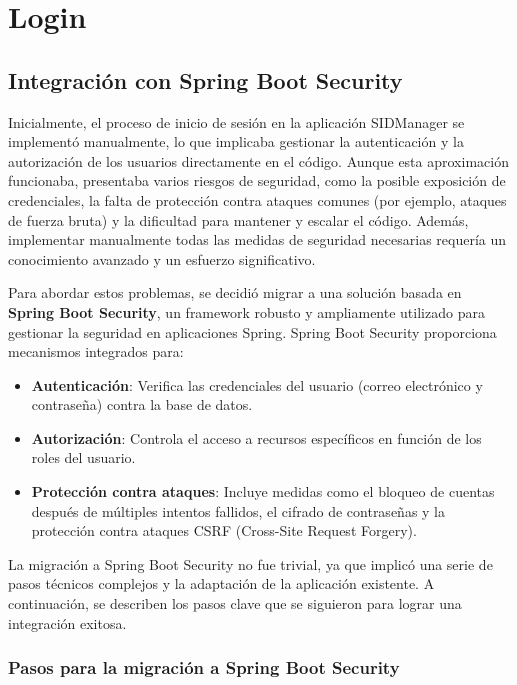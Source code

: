 \documentclass[draft]{scrbook}
\begin{document}
\section{ Login }
\label{sec:login}
\subsection{Integración con Spring Boot Security}
\label{subsec:spring-security}

Inicialmente, el proceso de inicio de sesión en la aplicación SIDManager se implementó manualmente, lo que implicaba gestionar la autenticación y la autorización de los usuarios directamente en el código. Aunque esta aproximación funcionaba, presentaba varios riesgos de seguridad, como la posible exposición de credenciales, la falta de protección contra ataques comunes (por ejemplo, ataques de fuerza bruta) y la dificultad para mantener y escalar el código. Además, implementar manualmente todas las medidas de seguridad necesarias requería un conocimiento avanzado y un esfuerzo significativo.

Para abordar estos problemas, se decidió migrar a una solución basada en \textbf{Spring Boot Security}, un framework robusto y ampliamente utilizado para gestionar la seguridad en aplicaciones Spring. Spring Boot Security proporciona mecanismos integrados para:

\begin{itemize}
    \item \textbf{Autenticación}: Verifica las credenciales del usuario (correo electrónico y contraseña) contra la base de datos.
    \item \textbf{Autorización}: Controla el acceso a recursos específicos en función de los roles del usuario.
    \item \textbf{Protección contra ataques}: Incluye medidas como el bloqueo de cuentas después de múltiples intentos fallidos, el cifrado de contraseñas y la protección contra ataques CSRF (Cross-Site Request Forgery).
\end{itemize}

La migración a Spring Boot Security no fue trivial, ya que implicó una serie de pasos técnicos complejos y la adaptación de la aplicación existente. A continuación, se describen los pasos clave que se siguieron para lograr una integración exitosa.

\subsubsection{Pasos para la migración a Spring Boot Security}
\end{document}
